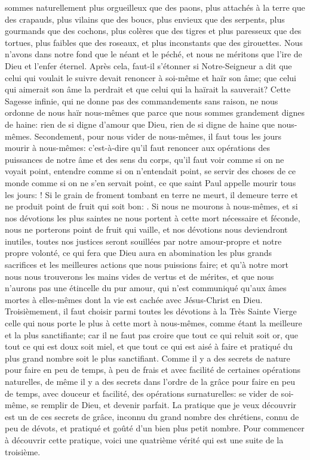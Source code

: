 sommes naturellement plus orgueilleux que des paons, plus attachés à la terre que des crapauds, plus vilains que
des boucs, plus envieux que des serpents, plus gourmands que des cochons, plus colères que des tigres et plus
paresseux que des tortues, plus faibles que des roseaux, et plus inconstants que des girouettes. Nous n'avons
dans notre fond que le néant et le péché, et nous ne méritons que l'ire de Dieu et l'enfer éternel.
 Après cela, faut-il s'étonner si Notre-Seigneur a dit que celui qui voulait le suivre devait renoncer à soi-même
et haïr son âme; que celui qui aimerait son âme la perdrait et que celui qui la haïrait la sauverait? Cette Sagesse
infinie, qui ne donne pas des commandements sans raison, ne nous ordonne de nous haïr nous-mêmes que parce
que nous sommes grandement dignes de haine: rien de si digne d'amour que Dieu, rien de si digne de haine que
nous-mêmes.
 Secondement, pour nous vider de nous-mêmes, il faut tous les jours mourir à nous-mêmes: c'est-à-dire qu'il
faut renoncer aux opérations des puissances de notre âme et des sens du corps, qu'il faut voir comme si on ne
voyait point, entendre comme si on n'entendait point, se servir des choses de ce monde comme si on ne s'en
servait point, ce que saint Paul appelle mourir tous les jours: ! Si le grain de froment tombant en
terre ne meurt, il demeure terre et ne produit point de fruit qui soit bon: . Si nous ne mourons à nous-mêmes, et si nos dévotions les plus saintes ne
nous portent à cette mort nécessaire et féconde, nous ne porterons point de fruit qui vaille, et nos dévotions nous
deviendront inutiles, toutes nos justices seront souillées par notre amour-propre et notre propre volonté, ce qui fera
que Dieu aura en abomination les plus grands sacrifices et les meilleures actions que nous puissions faire; et qu'à
notre mort nous nous trouverons les mains vides de vertus et de mérites, et que nous n'aurons pas une étincelle
du pur amour, qui n'est communiqué qu'aux âmes mortes à elles-mêmes dont la vie est cachée avec Jésus-Christ
en Dieu.
 Troisièmement, il faut choisir parmi toutes les dévotions à la Très Sainte Vierge celle qui nous porte le plus à
cette mort à nous-mêmes, comme étant la meilleure et la plus sanctifiante; car il ne faut pas croire que tout ce qui
reluit soit or, que tout ce qui est doux soit miel, et que tout ce qui est aisé à faire et pratiqué du plus grand nombre
soit le plus sanctifiant. Comme il y a des secrets de nature pour faire en peu de temps, à peu de frais et avec
facilité de certaines opérations naturelles, de même il y a des secrets dans l'ordre de la grâce pour faire en peu de
temps, avec douceur et facilité, des opérations surnaturelles: se vider de soi-même, se remplir de Dieu, et devenir
parfait.
La pratique que je veux découvrir est un de ces secrets de grâce, inconnu du grand nombre des chrétiens, connu
de peu de dévots, et pratiqué et goûté d'un bien plus petit nombre. Pour commencer à découvrir cette pratique,
voici une quatrième vérité qui est une suite de la troisième.
